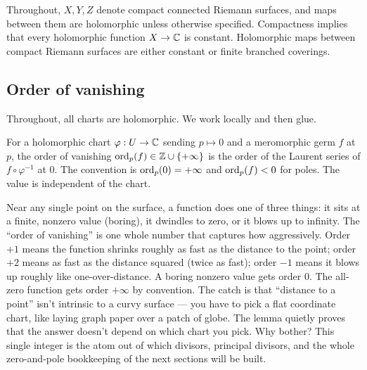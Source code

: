 Throughout, \(X,Y,Z\) denote compact connected Riemann surfaces, and maps
between them are holomorphic unless otherwise specified. Compactness implies
that every holomorphic function \(X\to\mathbb{C}\) is constant. Holomorphic maps
between compact Riemann surfaces are either constant or finite branched
coverings.

\subsection{Order of vanishing}

Throughout, all charts are holomorphic. We work locally and then glue.

\begin{definition}
\label{def:vanishing-order}
For a holomorphic chart \(\varphi:U\to\mathbb{C}\) sending \(p\mapsto 0\) and a
meromorphic germ \(f\) at \(p\), the order of vanishing
\(\operatorname{ord}_p(f)\in\mathbb{Z}\cup\{+\infty\}\) is the order of the Laurent series of
\(f\circ\varphi^{-1}\) at \(0\). The convention is
\(\operatorname{ord}_p(0)=+\infty\) and \(\operatorname{ord}_p(f)<0\) for poles. The value is
independent of the chart.
\leanok
\end{definition}

\begin{layman}
Near any single point on the surface, a function does one of three things: it
sits at a finite, nonzero value (boring), it dwindles to zero, or it blows up
to infinity. The ``order of vanishing'' is one whole number that captures how
aggressively. Order \(+1\) means the function shrinks roughly as fast as the
distance to the point; order \(+2\) means as fast as the distance squared
(twice as fast); order \(-1\) means it blows up roughly like one-over-distance.
A boring nonzero value gets order \(0\). The all-zero function gets order
\(+\infty\) by convention. The catch is that ``distance to a point'' isn't
intrinsic to a curvy surface --- you have to pick a flat coordinate chart, like
laying graph paper over a patch of globe. The lemma quietly proves that the
answer doesn't depend on which chart you pick. Why bother? This single integer
is the atom out of which divisors, principal divisors, and the whole
zero-and-pole bookkeeping of the next sections will be built.
\end{layman}

